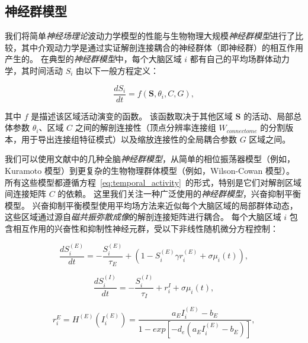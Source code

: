 \documentclass[lang=cn,a4paper,newtx,citestyle=gb7714-2015, bibstyle=gb7714-2015]{elegantpaper}
\begin{document}
\subsection{神经群模型} \label{sec:neural_mass}

我们将简单\textit{神经场理论}波动力学模型的性能与生物物理大规模\textit{神经群模型}进行了比较，其中介观动力学是通过实证解剖连接耦合的神经群体（即神经群）的相互作用产生的。
在典型的\textit{神经群模型}中，每个大脑区域 $ i $ 都有自己的平均场群体动力学，其时间活动 $ S_i $ 由以下一般方程定义：

\begin{equation}\label{eq:temporal_activity}
	\frac{dS_i}{dt} = f(\boldsymbol{S}, \theta_i, C, G), 
\end{equation}

其中 $ f $ 是描述该区域活动演变的函数。
该函数取决于其他区域 $ \boldsymbol{S} $ 的活动、局部总体参数 $ \theta_i $、区域 $ C $ 之间的解剖连接性（顶点分辨率连接组 $ W_{connectome} $ 的分割版本，用于导出连接组特征模式）以及缩放连接性的全局耦合参数 $ G $ 区域之间。


我们可以使用文献中的几种全脑\textit{神经群模型}\cite{sanz2013virtual}，从简单的相位振荡器模型（例如，Kuramoto 模型\cite{breakspear2010generative}）到更复杂的生物物理群体模型（例如，Wilson-Cowan 模型\cite{wilson1972excitatory}）。
所有这些模型都遵循方程~\ref{eq:temporal_activity}~的形式，特别是它们对解剖区域间连接矩阵 $ C $ 的依赖。
这里我们关注一种广泛使用的\textit{神经群模型}，兴奋抑制平衡模型\cite{deco2014local,deco2021dynamical,demirtacs2019hierarchical,aquino2022intersection}。
兴奋抑制平衡模型使用平均场方法来近似每个大脑区域的局部群体动态，这些区域通过源自\textit{磁共振弥散成像}的解剖连接矩阵进行耦合。
每个大脑区域 $ i $ 包含相互作用的兴奋性和抑制性神经元群，受以下非线性随机微分方程控制：

\begin{equation}\label{eq:synaptic_gating_E}
	\frac{dS_i^{(E)}}{dt} = - \frac{S_i^{(E)}}{\tau_E} + (1-S_i^{(E)} \gamma r_i^(E) + \sigma \mu_i(t)),
\end{equation}

\begin{equation}\label{eq:synaptic_gating_I}
	\frac{dS_i^{(I)}}{dt} = - \frac{S_i^{(I)}}{\tau_I} + r_i^{I} + \sigma \mu_i(t),
\end{equation}

\begin{equation}\label{eq:firing_rate_E}
	r_i^{E} = H^{(E)} (I_i^{(E)}) = \frac{a_E I_i^{(E)} - b_E}{1 - exp[-d_e (a_E I_i^{(E)} - b_E)]},
\end{equation}
\end{document}
